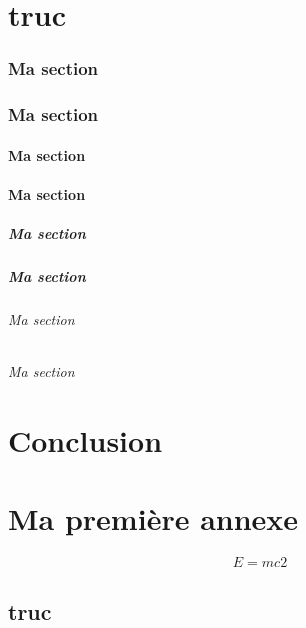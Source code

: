 \documentclass[bare]{polytech/polytech}
\begin{document}
\label{essai:chap2:sec}

  
\chapter{truc}
\lipsum[1-20]         
 
\subsection{Ma section}
\lipsum[1-5]           

\subsection{Ma section}
\lipsum[1-5]
\subsubsection{Ma section}
\lipsum[1-5]
\subsubsection{Ma section}
\lipsum[1-5]
\paragraph{Ma section}
\lipsum[1-5]
\paragraph{Ma section}
\lipsum[1-5]
\subparagraph{Ma section}
\lipsum[1-5]
\subparagraph{Ma section}
\lipsum[1-5]
  
\chapter*{Conclusion}

\appendix   

\chapter{Ma première annexe}

\label{ann:chap1}
        
\lipsum[1-4]

\begin{equation}
\label{eq:3}
E=mc2
\end{equation} 

\section{truc}
 
\end{document}
